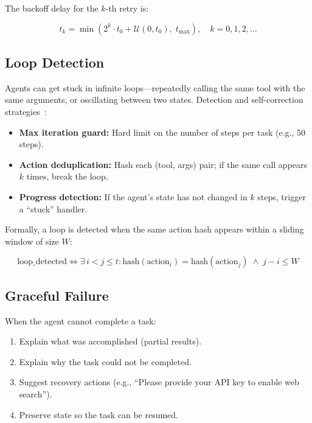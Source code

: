 The backoff delay for the $k$-th retry is:

\begin{equation}
t_k = \min\!\left(2^k \cdot t_0 + \mathcal{U}(0, t_0),\; t_{\max}\right), \quad k = 0, 1, 2, \ldots
\label{eq:backoff}
\end{equation}

\subsection{Loop Detection}
\label{loop-detection}

Agents can get stuck in infinite loops---repeatedly calling the same tool with the same arguments, or oscillating between two states. Detection and self-correction strategies~\cite{shinn2023reflexion}:

\begin{itemize}
  \item \textbf{Max iteration guard:} Hard limit on the number of steps per task (e.g., 50 steps).
  \item \textbf{Action deduplication:} Hash each (tool, args) pair; if the same call appears $k$ times, break the loop.
  \item \textbf{Progress detection:} If the agent’s state has not changed in $k$ steps, trigger a ``stuck'' handler.
\end{itemize}

Formally, a loop is detected when the same action hash appears within a sliding window of size $W$:

\begin{equation}
\text{loop\_detected} \iff \exists\, i < j \leq t: \text{hash}(\text{action}_i) = \text{hash}(\text{action}_j) \;\land\; j - i \leq W
\end{equation}

\subsection{Graceful Failure}
\label{graceful-failure}

When the agent cannot complete a task:

\begin{enumerate}
  \item Explain what was accomplished (partial results).
  \item Explain why the task could not be completed.
  \item Suggest recovery actions (e.g., ``Please provide your API key to enable web search'').
  \item Preserve state so the task can be resumed.
\end{enumerate}

